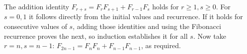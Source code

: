The addition identity $F_{r+s}=F_rF_{s+1}+F_{r-1}F_s$ holds for $r\ge1,s\ge0$. For $s=0,1$ it follows directly from the initial values and recurrence. If it holds for consecutive values of $s$, adding those identities and using the Fibonacci recurrence proves the next, so induction establishes it for all $s$. Now take $r=n,s=n-1$: $F_{2n-1}=F_nF_n+F_{n-1}F_{n-1}$, as required.
